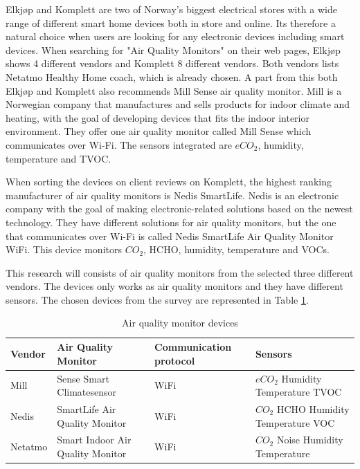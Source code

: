 Elkjøp \cite{Elkjøp} and Komplett \cite{Komplett} are two of Norway's biggest electrical stores with a wide range of different smart home devices both in store and online. Its therefore a natural choice when users are looking for any electronic devices including smart devices. When searching for "Air Quality Monitors" on their web pages, Elkjøp shows 4 different vendors and Komplett 8 different vendors. Both vendors lists Netatmo Healthy Home coach, which is already chosen. A part from this both Elkjøp and Komplett also recommends Mill Sense air quality monitor. Mill \cite{Mill} is a Norwegian company that manufactures and sells products for indoor climate and heating, with the goal of developing devices that fits the indoor interior environment. They offer one air quality monitor called Mill Sense which communicates over \gls{Wi-Fi}. The sensors integrated are \(eCO_2\), humidity, temperature and \gls{TVOC}.

When sorting the devices on client reviews on Komplett, the highest ranking manufacturer of air quality monitors is Nedis SmartLife\cite{Komplett}. Nedis \cite{Nedis} is an electronic company with the goal of making electronic-related solutions based on the newest technology. They have different solutions for air quality monitors, but the one that communicates over \gls{Wi-Fi} is called Nedis SmartLife Air Quality Monitor WiFi. This device monitors \(CO_2\), HCHO, humidity, temperature and VOCs. 

This research will consists of air quality monitors from the selected three different vendors. The devices only works as air quality monitors and they have different sensors. The chosen devices from the survey are represented in Table \ref{tab:AQMSurvey}. 

\begin{table}[H]
    \centering
    \caption{Air quality monitor devices}
    \begin{tabular}{| p{1.5cm} | p{5.5cm} | p{3cm} | p{2cm} |} 
        \hline
        \textbf{Vendor} & \textbf{Air Quality Monitor} & \textbf{Communication protocol} & \textbf{Sensors} \\
        \hline
        Mill & Sense Smart Climatesensor & WiFi & \(eCO_2\) \newline Humidity \newline Temperature \newline \gls{TVOC} \\
        \hline
        Nedis & SmartLife Air Quality Monitor & WiFi & \(CO_2\) \newline HCHO \newline Humidity \newline Temperature \newline VOC \\
        \hline
        Netatmo & Smart Indoor Air Quality Monitor & WiFi & \(CO_2\) \newline Noise \newline Humidity \newline Temperature \\
        \hline
    \end{tabular}
    \label{tab:AQMSurvey}
\end{table}

